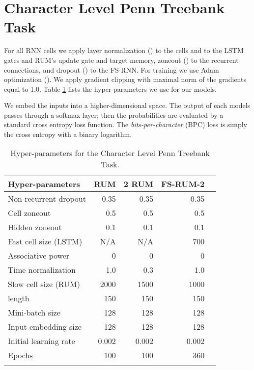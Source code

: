 \documentclass{article} \usepackage{iclr2018_conference,times}
\begin{document}
\section{Character Level Penn Treebank Task} \label{app:sec:ptb}
For all RNN cells we apply layer normalization (\cite{ba2016ln}) to the cells and to the LSTM gates and RUM's update gate and target memory, zoneout (\cite{krueger2016zoneout}) to the recurrent connections, and dropout (\cite{srivastava2014dropout}) to the FS-RNN. For training we use Adam optimization (\cite{kingma2015adam}). We apply gradient clipping  with maximal norm of the gradients equal to 1.0. Table \ref{tbl:ptb:hyper} lists the hyper-parameters we use for our models. 

We embed the inputs into a higher-dimensional space. The output of each models passes through a softmax layer; then the probabilities are evaluated by a standard cross entropy loss function. The \textit{bits-per-character} (BPC) loss is simply the cross entropy with a binary logarithm.

\begin{table}[h!]
\centering
\begin{tabular}{lrrrr}
\toprule
  Hyper-parameters & RUM & 2  RUM & FS-RUM-2 \\ 
   \hline
   Non-recurrent dropout & 0.35 & 0.35 & 0.35 \\
   Cell zoneout & 0.5 & 0.5 & 0.5  \\ 
   Hidden zoneout & 0.1 & 0.1 & 0.1  \\ 
   \hline 
   Fast cell size (LSTM) & N/A & N/A & 700  \\ 
   Associative power  & 0 & 0 & 0  \\
   Time normalization  & 1.0 & 0.3 & 1.0  \\ 
   \hline
   Slow cell size (RUM)  & 2000 & 1500 & 1000  \\ 
   \hline 
    length & 150 & 150 & 150  \\ 
   Mini-batch size & 128 & 128 & 128  \\ 
   Input embedding size & 128 & 128 & 128  \\ 
   Initial learning rate & 0.002 & 0.002 & 0.002  \\ 
   Epochs & 100 & 100 & 360  \\ 
\bottomrule \\
\end{tabular}
\caption{Hyper-parameters for the Character Level Penn Treebank Task.}
\label{tbl:ptb:hyper}
\end{table}
\end{document}
